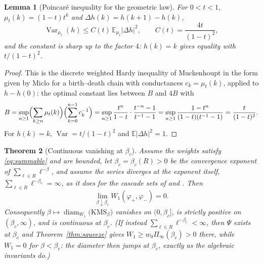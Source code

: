 \documentclass[11pt]{amsart}
\numberwithin{equation}{section}
\newtheorem{theorem}{Theorem}[section]
\newtheorem{lemma}[theorem]{Lemma}
\theoremstyle{definition}
\theoremstyle{remark}
\newcommand{\Var}{\operatorname{Var}}
\newcommand{\diam}{\operatorname{diam}}
\begin{document}
\begin{lemma}[Poincar\'e inequality for the geometric law]\label{lem:poincare}
For $0<t<1$, $\mu_t(k)=(1-t)t^k$ and $\Delta h(k)=h(k+1)-h(k)$,
\begin{equation}\label{eq:poincare}
\Var_{\mu_t}(h)\le C(t)\,\mathbb E_{\mu_t}|\Delta h|^2,\qquad C(t)=\frac{4t}{(1-t)^2},
\end{equation}
and the constant is sharp up to the factor $4$: $h(k)=k$ gives equality with $t/(1-t)^2$.
\end{lemma}

\begin{proof}
This is the discrete weighted Hardy inequality of Muckenhoupt \cite{Muck} in the form
given by Miclo \cite{Miclo} for a birth--death chain with conductances $c_k=\mu_t(k)$,
applied to $h-h(0)$: the optimal constant lies between $B$ and $4B$ with
\[
B=\sup_{n\ge1}\Bigl(\sum_{k\ge n}\mu_t(k)\Bigr)\Bigl(\sum_{k=0}^{n-1}c_k^{-1}\Bigr)
=\sup_{n\ge1}\frac{t^n}{1-t}\cdot\frac{t^{-n}-1}{t^{-1}-1}
=\sup_{n\ge1}\frac{1-t^n}{(1-t)(t^{-1}-1)}=\frac{t}{(1-t)^2}.
\]
For $h(k)=k$, $\Var=t/(1-t)^2$ and $\mathbb E|\Delta h|^2=1$.
\end{proof}

\begin{theorem}[Continuous vanishing at $\beta_c$]\label{thm:continuous}
Assume the weights satisfy \eqref{eq:summable} and are bounded, let $\beta_c=\beta_c(R)>0$
be the convergence exponent of $\sum_{\ell\in R}\ell^{-\beta}$, and assume the series
diverges at the exponent itself, $\sum_{\ell\in R}\ell^{-\beta_c}=\infty$, as it does for
the cascade sets of \cite[Prop.~4.16]{Main} and \cite[Lem.~5.4]{SeriesI}. Then
\[
\lim_{\beta\downarrow\beta_c}W_1(\varphi_+,\varphi_-)=0 .
\]
Consequently $\beta\mapsto\diam_{W_1}\bigl(\mathrm{KMS}_\beta\bigr)$ vanishes on
$(0,\beta_c]$, is strictly positive on $(\beta_c,\infty)$, and is continuous at $\beta_c$.
(If instead $\sum_{\ell\in R}\ell^{-\beta_c}<\infty$, then $\Psi$ exists at $\beta_c$ and
Theorem~\ref{thm:squeeze} gives $W_1\ge w_0\Pi_\infty(\beta_c)>0$ there, while $W_1=0$ for
$\beta<\beta_c$: the diameter then jumps at $\beta_c$, exactly as the algebraic
invariants do.)
\end{theorem}
\end{document}
